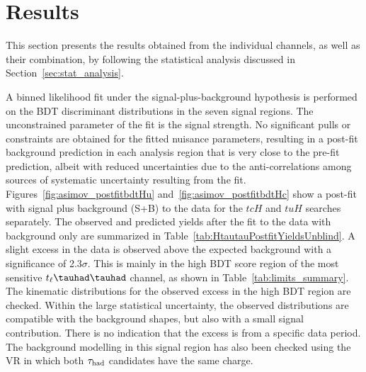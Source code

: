 \section{Results}
\label{sec:result}

This section presents the results obtained from the individual channels, as well as their combination,
by following the statistical analysis discussed in Section~\ref{sec:stat_analysis}.

A binned likelihood fit under the signal-plus-background hypothesis is performed on the BDT discriminant distributions in the seven 
signal regions. The unconstrained parameter of the fit is the signal strength.
No significant pulls or constraints are obtained for the fitted nuisance parameters, resulting in a post-fit background prediction in each analysis region that is
very close to the pre-fit prediction, albeit with reduced uncertainties due to the anti-correlations among sources of systematic uncertainty resulting from the fit.
Figures~\ref{fig:asimov_postfitbdtHu} and~\ref{fig:asimov_postfitbdtHc} show a post-fit with signal plus background (S+B) to the data for
the $tcH$ and $tuH$ searches separately.
The observed and predicted yields after the fit to the data with background only are summarized in Table~\ref{tab:HtautauPostfitYieldsUnblind}.
A slight excess in the data is observed above the expected background with a significance of 2.3$\sigma$. This is mainly in the high BDT score region of the most sensitive $t_{\ell}\thadhad$ channel, as shown in
Table~\ref{tab:limits_summary}.
The kinematic distributions for the observed excess in
the high BDT region are checked. Within the large statistical uncertainty, the observed distributions are compatible with the background shapes, but also with a small signal contribution. There is no indication that the excess is from a specific data period.
The background modelling in this signal region has also been checked using the VR in which both $\tau_\text{had}$ candidates have the same charge.
